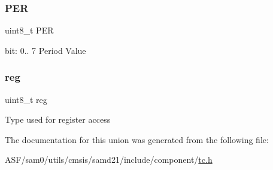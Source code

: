 \subsubsection{\texorpdfstring{PER}{PER}}
{\footnotesize\ttfamily uint8\+\_\+t P\+ER}

bit\+: 0.. 7 Period Value \mbox{\label{union_t_c___c_o_u_n_t8___p_e_r___type_a9428adc9af4653a2050e2536b55dec8d}} 
\subsubsection{\texorpdfstring{reg}{reg}}
{\footnotesize\ttfamily uint8\+\_\+t reg}

Type used for register access 

The documentation for this union was generated from the following file\+:\begin{DoxyCompactItemize}
\item 
A\+S\+F/sam0/utils/cmsis/samd21/include/component/\mbox{\hyperlink{utils_2cmsis_2samd21_2include_2component_2tc_8h}{tc.\+h}}\end{DoxyCompactItemize}
